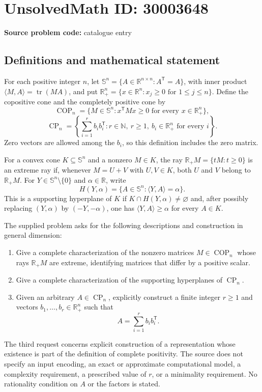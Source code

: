 \documentclass[11pt]{article}
\newcommand{\N}{\mathbb{N}}
\newcommand{\R}{\mathbb{R}}
\begin{document}
\section*{UnsolvedMath ID: 30003648}
\textbf{Source problem code:} catalogue entry
\subsection{Definitions and mathematical statement}
For each positive integer \(n\), let \(\mathbb S^n=\{A\in\R^{n\times n}:A^{\mathsf T}=A\}\), with inner product \(\langle M,A\rangle=\operatorname{tr}(MA)\), and put \(\R_+^n=\{x\in\R^n:x_j\geq0\text{ for }1\leq j\leq n\}\). Define the copositive cone and the completely positive cone by
\[
\operatorname{COP}_n=\{M\in\mathbb S^n:x^{\mathsf T}Mx\geq0\text{ for every }x\in\R_+^n\},
\]
\[
\operatorname{CP}_n=\left\{\sum_{i=1}^{r}b_i b_i^{\mathsf T}:r\in\N,\ r\geq1,\ b_i\in\R_+^n\text{ for every }i\right\}.
\]
Zero vectors are allowed among the \(b_i\), so this definition includes the zero matrix.

For a convex cone \(K\subseteq\mathbb S^n\) and a nonzero \(M\in K\), the ray \(\R_+M=\{tM:t\geq0\}\) is an extreme ray if, whenever \(M=U+V\) with \(U,V\in K\), both \(U\) and \(V\) belong to \(\R_+M\). For \(Y\in\mathbb S^n\setminus\{0\}\) and \(\alpha\in\R\), write
\[
H(Y,\alpha)=\{A\in\mathbb S^n:\langle Y,A\rangle=\alpha\}.
\]
This is a supporting hyperplane of \(K\) if \(K\cap H(Y,\alpha)\neq\varnothing\) and, after possibly replacing \((Y,\alpha)\) by \((-Y,-\alpha)\), one has \(\langle Y,A\rangle\geq\alpha\) for every \(A\in K\).

The supplied problem asks for the following descriptions and construction in general dimension:
\begin{enumerate}
\item Give a complete characterization of the nonzero matrices \(M\in\operatorname{COP}_n\) whose rays \(\R_+M\) are extreme, identifying matrices that differ by a positive scalar.
\item Give a complete characterization of the supporting hyperplanes of \(\operatorname{CP}_n\).
\item Given an arbitrary \(A\in\operatorname{CP}_n\), explicitly construct a finite integer \(r\geq1\) and vectors \(b_1,\ldots,b_r\in\R_+^n\) such that
\[
A=\sum_{i=1}^{r}b_i b_i^{\mathsf T}.
\]
\end{enumerate}
The third request concerns explicit construction of a representation whose existence is part of the definition of complete positivity. The source does not specify an input encoding, an exact or approximate computational model, a complexity requirement, a prescribed value of \(r\), or a minimality requirement. No rationality condition on \(A\) or the factors is stated.
\end{document}
